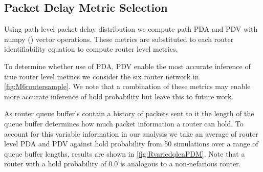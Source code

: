 \subsection{Packet Delay Metric Selection}
\label{ssec:MPDMseclection}
Using path level packet delay distribution we compute path PDA and PDV with numpy (\cite{harris_array_2020}) vector operations. These metrics are substituted to each router identifiability equation to compute router level metrics.\par
To determine whether use of PDA, PDV enable the most accurate inference of true router level metrics we consider the six router network in \cref{fig:M6routersample}. We note that a combination of these metrics may enable more accurate inference of hold probability but leave this to future work.\par
As router queue buffer's contain a history of packets sent to it the length of the queue buffer determines how much packet information a router can hold. To account for this variable information in our analysis we take an average of router level PDA and PDV against hold probability from 50 simulations over a range of queue buffer lengths, results are shown in \cref{fig:RvariedqlenPDM}. Note that a router with a hold probability of 0.0 is analogous to a non-nefarious router.\par
